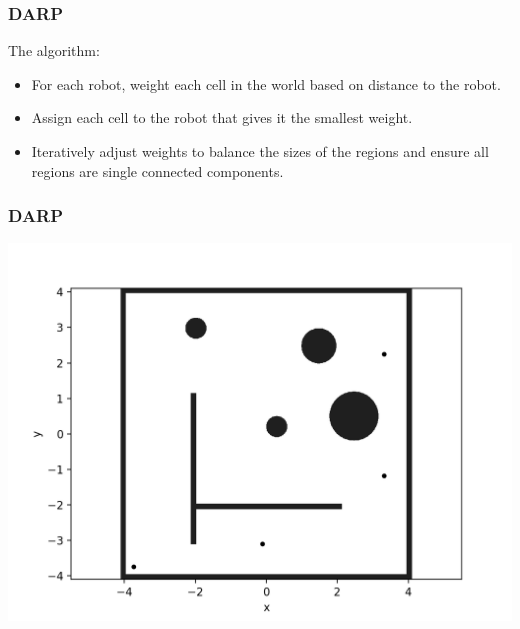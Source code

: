 \documentclass{beamer}
\begin{document}
	\begin{frame}
		\frametitle{DARP}
		The algorithm:
		\begin{itemize}
			\item<2-> For each robot, weight each cell in the world based on distance to the robot.
			\item<3-> Assign each cell to the robot that gives it the smallest weight.
			\item<4-> Iteratively adjust weights to balance the sizes of the regions and ensure all regions are single connected components.
		\end{itemize}
	
	\end{frame}
	
	\begin{frame}
		\frametitle{DARP}
		\includegraphics[width=\linewidth]{DARPImages/World_with_robots}

	\end{frame}
\end{document}
